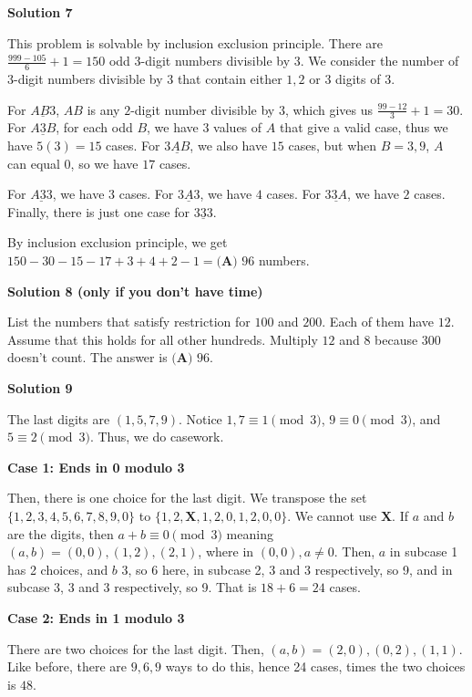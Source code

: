 \begin{enumerate}
\textbf{Solution 7}

This problem is solvable by inclusion exclusion principle. There are $\frac{999-105}{6} + 1 = 150$ odd $3$-digit numbers divisible by $3$. We consider the number of $3$-digit numbers divisible by $3$ that contain either $1, 2$ or $3$ digits of $3$.

 For $\underline{AB3}$, $AB$ is any $2$-digit number divisible by $3$, which gives us $\frac{99-12}{3} + 1 = 30$. For $\underline{A3B}$, for each odd $B$, we have $3$ values of $A$ that give a valid case, thus we have $5(3) = 15$ cases. For $\underline{3AB}$, we also have $15$ cases, but when $B=3, 9$, $A$ can equal $0$, so we have $17$ cases. 

 For $\underline{A33}$, we have $3$ cases. For $\underline{3A3}$, we have $4$ cases. For $\underline{33A}$, we have $2$ cases. Finally, there is just one case for $\underline{333}$. 

 By inclusion exclusion principle, we get $150 - 30 - 15 - 17 + 3 + 4 + 2 - 1 = \boxed{\textbf{(A) } 96}$ numbers.

 



\textbf{Solution 8 (only if you don't have time)}

List the numbers that satisfy restriction for $100$ and $200$. Each of them have $12$. Assume that this holds for all other hundreds. Multiply $12$ and $8$ because $300$ doesn't count. The answer is $\boxed{\textbf{(A) } 96}$.

 



\textbf{Solution 9}

The last digits are $(1,5,7,9)$. Notice $1,7 \equiv 1 \pmod{3}$, $9 \equiv 0 \pmod{3}$, and $5 \equiv 2 \pmod{3}$. Thus, we do casework.

 \textbf{Case 1: Ends in 0 modulo 3}

 Then, there is one choice for the last digit. We transpose the set $\{1,2,3,4,5,6,7,8,9,0 \}$ to $\{1,2,\textbf{X}, 1,2,0,1,2,0,0 \}$. We cannot use $\textbf{X}$. If $a$ and $b$ are the digits, then $a+b \equiv 0 \pmod{3}$ meaning $(a,b) = (0,0), (1,2), (2,1)$, where in $(0,0), a \neq 0$. Then, $a$ in subcase 1 has 2 choices, and $b$ 3, so 6 here, in subcase 2, $3$ and $3$ respectively, so 9, and in subcase 3, $3$ and $3$ respectively, so 9. That is $18+6 = 24$ cases.

 \textbf{Case 2: Ends in 1 modulo 3}

 There are two choices for the last digit. Then, $(a,b) = (2,0), (0,2), (1,1)$. Like before, there are $9,6,9$ ways to do this, hence 24 cases, times the two choices is $48$.


\end{enumerate}
